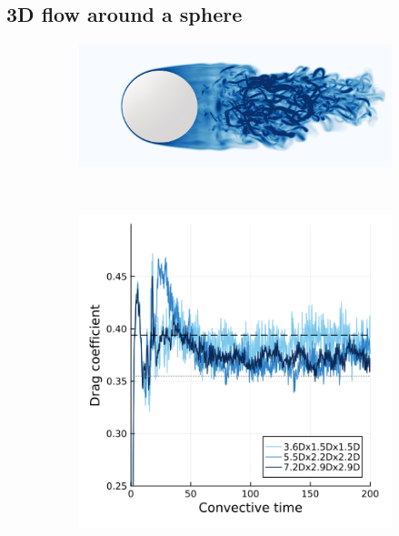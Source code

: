 \documentclass[final,1p,times]{elsarticle}
\begin{document}
\subsection{3D flow around a sphere}

\begin{figure}
    \centering
    \begin{subfigure}{.8\textwidth}
        \centering
        \includegraphics[width=\textwidth]{tex//fig/sphere3_zoom.png}
    \end{subfigure}%
    \\
    \begin{subfigure}{.4\textwidth}
        \centering
        \includegraphics[width=\textwidth]{tex//fig/drag.png}
    \end{subfigure}%
    \hspace{6mm}

\end{figure}
\end{document}
